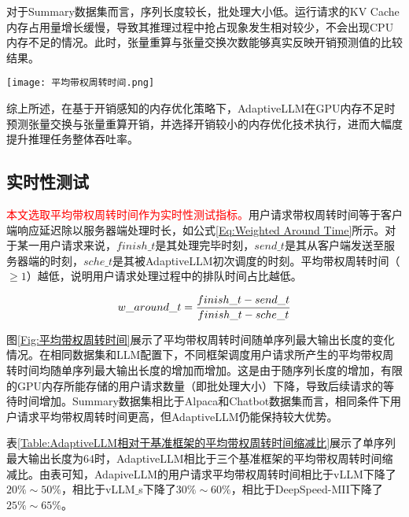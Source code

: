 对于Summary数据集而言，序列长度较长，批处理大小低。运行请求的KV Cache内存占用量增长缓慢，导致其推理过程中抢占现象发生相对较少，不会出现CPU内存不足的情况。此时，张量重算与张量交换次数能够真实反映开销预测值的比较结果。

\begin{figure*}[!htbp]
  \centering
  \texttt{[image: 平均带权周转时间.png]}
  \caption{用户请求平均带权周转时间}
  \label{Fig:平均带权周转时间}
\end{figure*}

综上所述，在基于开销感知的内存优化策略下，AdaptiveLLM在GPU内存不足时预测张量交换与张量重算开销，并选择开销较小的内存优化技术执行，进而大幅度提升推理任务整体吞吐率。 

\subsection{实时性测试}

\textcolor{red}{本文选取平均带权周转时间作为实时性测试指标。}用户请求带权周转时间等于客户端响应延迟除以服务器端处理时长，如公式\ref{Eq:Weighted Around Time}所示。对于某一用户请求来说，$finish\_t$是其处理完毕时刻，$send\_t$是其从客户端发送至服务器端的时刻，$sche\_t$是其被AdaptiveLLM初次调度的时刻。平均带权周转时间（$\geq 1$）越低，说明用户请求处理过程中的排队时间占比越低。 

\begin{equation}
  \begin{aligned}
    w\_around\_t = \frac{finish\_t - send\_t}{finish\_t - sche\_t}
  \end{aligned}
  \label{Eq:Weighted Around Time}
  \setlength{\abovedisplayskip}{0ex}
  \setlength{\belowdisplayskip}{2ex}
\end{equation}

图\ref{Fig:平均带权周转时间}展示了平均带权周转时间随单序列最大输出长度的变化情况。在相同数据集和LLM配置下，不同框架调度用户请求所产生的平均带权周转时间均随单序列最大输出长度的增加而增加。这是由于随序列长度的增加，有限的GPU内存所能存储的用户请求数量（即批处理大小）下降，导致后续请求的等待时间增加。Summary数据集相比于Alpaca和Chatbot数据集而言，相同条件下用户请求平均带权周转时间更高，但AdaptiveLLM仍能保持较大优势。

表\ref{Table:AdaptiveLLM相对于基准框架的平均带权周转时间缩减比}展示了单序列最大输出长度为64时，AdaptiveLLM相比于三个基准框架的平均带权周转时间缩减比。由表可知，AdapiveLLM的用户请求平均带权周转时间相比于vLLM下降了$20\%\sim50\%$，相比于vLLM$\_$s下降了$30\%\sim60\%$，相比于DeepSpeed-MII下降了$25\%\sim65\%$。

